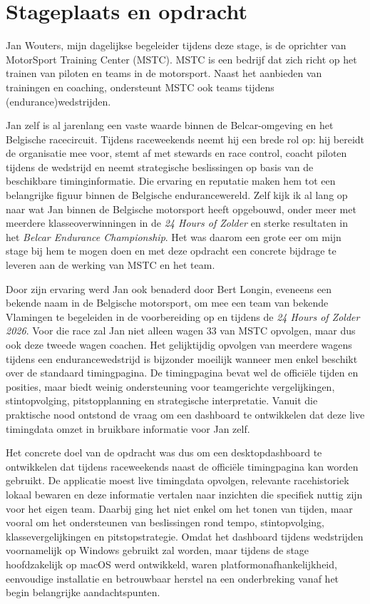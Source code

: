 \section{Stageplaats en opdracht}
Jan Wouters, mijn dagelijkse begeleider tijdens deze stage, is de oprichter van MotorSport Training Center (MSTC). MSTC is een bedrijf dat zich richt op het trainen van piloten en teams in de motorsport. Naast het aanbieden van trainingen en coaching, ondersteunt MSTC ook teams tijdens (endurance)wedstrijden. 

Jan zelf is al jarenlang een vaste waarde binnen de Belcar-omgeving en het Belgische racecircuit. Tijdens raceweekends neemt hij een brede rol op: hij bereidt de organisatie mee voor, stemt af met stewards en race control, coacht piloten tijdens de wedstrijd en neemt strategische beslissingen op basis van de beschikbare timinginformatie. Die ervaring en reputatie maken hem tot een belangrijke figuur binnen de Belgische endurancewereld. Zelf kijk ik al lang op naar wat Jan binnen de Belgische motorsport heeft opgebouwd, onder meer met meerdere klasseoverwinningen in de \emph{24 Hours of Zolder} en sterke resultaten in het \emph{Belcar Endurance Championship}. Het was daarom een grote eer om mijn stage bij hem te mogen doen en met deze opdracht een concrete bijdrage te leveren aan de werking van MSTC en het team.

Door zijn ervaring werd Jan ook benaderd door Bert Longin, eveneens een bekende naam in de Belgische motorsport, om mee een team van bekende Vlamingen te begeleiden in de voorbereiding op en tijdens de \emph{24 Hours of Zolder 2026}. Voor die race zal Jan niet alleen wagen 33 van MSTC opvolgen, maar dus ook deze tweede wagen coachen. Het gelijktijdig opvolgen van meerdere wagens tijdens een endurancewedstrijd is bijzonder moeilijk wanneer men enkel beschikt over de standaard timingpagina. De timingpagina bevat wel de officiële tijden en posities, maar biedt weinig ondersteuning voor teamgerichte vergelijkingen, stintopvolging, pitstopplanning en strategische interpretatie. Vanuit die praktische nood ontstond de vraag om een dashboard te ontwikkelen dat deze live timingdata omzet in bruikbare informatie voor Jan zelf.

Het concrete doel van de opdracht was dus om een desktopdashboard te ontwikkelen dat tijdens raceweekends naast de officiële timingpagina kan worden gebruikt. De applicatie moest live timingdata opvolgen, relevante racehistoriek lokaal bewaren en deze informatie vertalen naar inzichten die specifiek nuttig zijn voor het eigen team. Daarbij ging het niet enkel om het tonen van tijden, maar vooral om het ondersteunen van beslissingen rond tempo, stintopvolging, klassevergelijkingen en pitstopstrategie. Omdat het dashboard tijdens wedstrijden voornamelijk op Windows gebruikt zal worden, maar tijdens de stage hoofdzakelijk op macOS werd ontwikkeld, waren platformonafhankelijkheid, eenvoudige installatie en betrouwbaar herstel na een onderbreking vanaf het begin belangrijke aandachtspunten.

